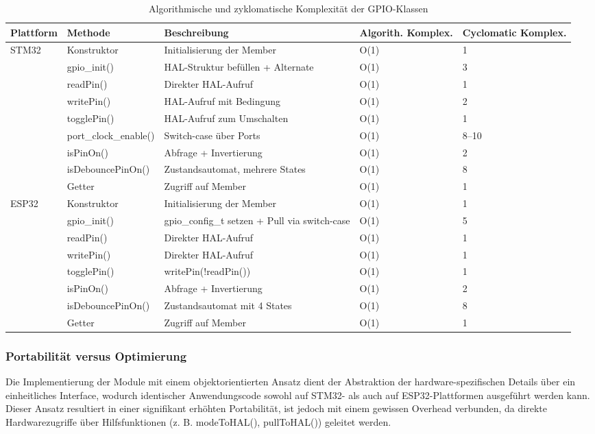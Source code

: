 \begin{table}[H]
\centering
	\begin{tabular}{@{}llp{4cm}p{2cm}p{2cm}@{}}
	\toprule
\textbf{Plattform} & \textbf{Methode} & \textbf{Beschreibung} & \textbf{Algorith. Komplex.} & \textbf{Cyclomatic Komplex.} \\ \midrule
STM32 & Konstruktor & Initialisierung der Member & O(1) & 1 \\
      & gpio\_init() & HAL-Struktur befüllen + Alternate & O(1) & 3 \\
      & readPin() & Direkter HAL-Aufruf & O(1) & 1 \\
      & writePin() & HAL-Aufruf mit Bedingung & O(1) & 2 \\
      & togglePin() & HAL-Aufruf zum Umschalten & O(1) & 1 \\
      & port\_clock\_enable() & Switch-case über Ports & O(1) & 8--10 \\
      & isPinOn() & Abfrage + Invertierung & O(1) & 2 \\
      & isDebouncePinOn() & Zustandsautomat, mehrere States & O(1) & 8 \\
      & Getter & Zugriff auf Member & O(1) & 1 \\ \midrule
ESP32 & Konstruktor & Initialisierung der Member & O(1) & 1 \\
      & gpio\_init() & gpio\_config\_t setzen + Pull via switch-case & O(1) & 5 \\
      & readPin() & Direkter HAL-Aufruf & O(1) & 1 \\
      & writePin() & Direkter HAL-Aufruf & O(1) & 1 \\
      & togglePin() & writePin(!readPin()) & O(1) & 1 \\
      & isPinOn() & Abfrage + Invertierung & O(1) & 2 \\
      & isDebouncePinOn() & Zustandsautomat mit 4 States & O(1) & 8 \\
      & Getter & Zugriff auf Member & O(1) & 1 \\ 
	\bottomrule
	\end{tabular}
	\caption{Algorithmische und zyklomatische Komplexität der GPIO-Klassen}
	\label{tab:gpio_complexity}
\end{table}


\subsubsection{Portabilität versus Optimierung}
Die Implementierung der Module mit einem objektorientierten Ansatz dient der Abstraktion der hardware-spezifischen Details über ein einheitliches Interface, wodurch identischer Anwendungscode sowohl auf STM32- als auch auf ESP32-Plattformen ausgeführt werden kann. 
Dieser Ansatz resultiert in einer signifikant erhöhten Portabilität, ist jedoch mit einem gewissen Overhead verbunden, da direkte Hardwarezugriffe über Hilfsfunktionen (z. B. modeToHAL(), pullToHAL()) geleitet werden. 


